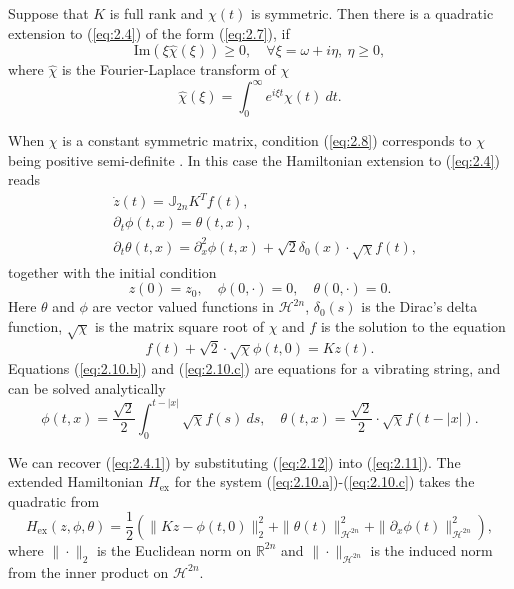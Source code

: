 {\edit
\begin{theorem} \cite{Figotin:2006jy}
Suppose that $K$ is full rank and $\chi(t)$ is symmetric. Then there is a quadratic extension to (\ref{eq:2.4}) of the form (\ref{eq:2.7}), if
\begin{equation} \label{eq:2.8}
	\text{Im}(\xi\hat{\chi}(\xi)) \geq 0, \quad \forall \xi = \omega + i\eta, \ \eta \geq 0,
\end{equation}
where $\hat{\chi}$ is the Fourier-Laplace transform of $\chi$
\begin{equation} \label{eq:2.9}
	\hat{\chi}(\xi) = \int_0^\infty e^{i\xi t} \chi(t)\ dt.
\end{equation}
\end{theorem}
When $\chi$ is a constant symmetric matrix, condition (\ref{eq:2.8}) corresponds to $\chi$ being positive semi-definite \cite{Figotin:2006jy}. In this case the Hamiltonian extension to (\ref{eq:2.4}) reads
\begin{subequations}
\begin{align}
		\label{eq:2.10.a} & \dot{z}(t) = \mathbb J_{2n} K^T f(t), \\
		\label{eq:2.10.b} & \partial_t \phi(t,x) = \theta(t,x), \\
		\label{eq:2.10.c} & \partial_t \theta(t,x) = \partial_x^2 \phi(t,x) + \sqrt 2 \delta_0(x) \cdot \sqrt{\chi}  f(t), 
\end{align}
\end{subequations}
together with the initial condition
\begin{equation} \label{eq:2.10.1}
	z(0) = z_0,\quad \phi(0,\cdot) = 0, \quad \theta(0,\cdot) = 0.
\end{equation}
Here $\theta$ and $\phi$ are vector valued functions in $\mathcal H^{2n}$, $\delta_0(s)$ is the Dirac's delta function, $\sqrt{ \chi}$ is the matrix square root of $\chi$ and $f$ is the solution to the equation
\begin{equation} \label{eq:2.11}
	f(t) + \sqrt{2} \cdot \sqrt{ \chi } \phi(t,0) = Kz(t).
\end{equation}
Equations (\ref{eq:2.10.b}) and (\ref{eq:2.10.c}) are equations for a vibrating string, and can be solved analytically
\begin{equation} \label{eq:2.12}
	\phi(t,x) = \frac {\sqrt 2} 2 \int_0^{t-|x|} \sqrt{\chi} f(s)\ ds,\quad \theta(t,x) = \frac{\sqrt 2}{2} \cdot \sqrt{\chi} f(t - |x|).
\end{equation}
}We can recover (\ref{eq:2.4.1}) by substituting (\ref{eq:2.12}) into (\ref{eq:2.11}). The extended Hamiltonian $H_\text{ex}$ for the system (\ref{eq:2.10.a})-(\ref{eq:2.10.c}) takes the quadratic from
\begin{equation} \label{eq:2.13}
	H_\text{ex}(z,\phi,\theta) = \frac 1 2 \left( \| Kz - \phi(t,0) \|_2^2 + \| \theta(t) \|^2_{\mathcal H^{2n} } + \| \partial_x\phi(t)\|^2_{\mathcal H^{2n} }\right),
\end{equation}
where $\| \cdot \|_2$ is the Euclidean norm on $\mathbb R^{2n}$ and $\| \cdot \|_{\mathcal H^{2n}}$ is the induced norm from the inner product on $\mathcal H^{2n}$. 

